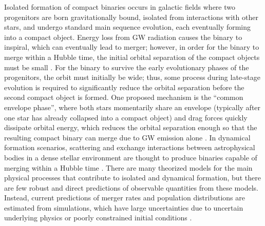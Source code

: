 Isolated formation of compact binaries occurs in galactic fields where two progenitors are born gravitationally bound, isolated from interactions with other stars, and undergo standard main sequence evolution, each eventually forming into a compact object. Energy loss from GW radiation causes the binary to inspiral, which can eventually lead to merger; however, in order for the binary to merge within a Hubble time, the initial orbital separation of the compact objects must be small \citep{10.1051/0004-6361/201936204,10.1007/s41114-021-00034-3}. For the binary to survive the early evolutionary phases of the progenitors, the orbit must initially be wide; thus, some process during late-stage evolution is required to significantly reduce the orbital separation before the second compact object is formed. One proposed mechanism is the ``common envelope phase'', where both stars momentarily share an envelope (typically after one star has already collapsed into a compact object) and drag forces quickly dissipate orbital energy, which reduces the orbital separation enough so that the resulting compact binary can merge due to GW emission alone \citep{10.1038/nature18322}. In dynamical formation scenarios, scattering and exchange interactions between astrophysical bodies in a dense stellar environment are thought to produce binaries capable of merging within a Hubble time \citep{1602.02444}. There are many theorized models for the main physical processes that contribute to isolated and dynamical formation, but there are few robust and direct predictions of observable quantities from these models. Instead, current predictions of merger rates and population distributions are estimated from simulations, which have large uncertainties due to uncertain underlying physics or poorly constrained initial conditions \citep{1308.1546, 1806.00001v3, 10.1051/0004-6361/201936204, 10.1007/s41114-021-00034-3}.


